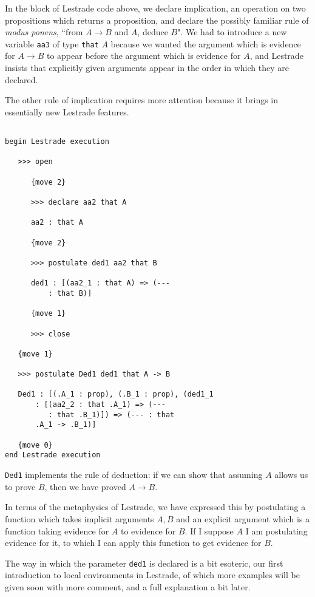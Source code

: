 \documentclass[12pt]{article}
\begin{document}
In the block of Lestrade code above, we declare implication, an operation on two propositions which returns a proposition, and
declare the possibly familiar rule of {\em modus ponens\/}, ``from $A \rightarrow B$ and $A$, deduce $B$".  We had to introduce a new variable {\tt aa3} of type {\tt that} $A$ because we wanted the argument which is evidence for $A \rightarrow B$ to appear before the argument which is evidence for $A$, and Lestrade insists that explicitly given arguments appear in the order in which they are declared.

The other rule of implication requires more attention because it brings in essentially new Lestrade features.

\begin{verbatim}

begin Lestrade execution

   >>> open

      {move 2}

      >>> declare aa2 that A

      aa2 : that A

      {move 2}

      >>> postulate ded1 aa2 that B

      ded1 : [(aa2_1 : that A) => (--- 
          : that B)]

      {move 1}

      >>> close

   {move 1}

   >>> postulate Ded1 ded1 that A -> B

   Ded1 : [(.A_1 : prop), (.B_1 : prop), (ded1_1 
       : [(aa2_2 : that .A_1) => (--- 
          : that .B_1)]) => (--- : that 
       .A_1 -> .B_1)]

   {move 0}
end Lestrade execution

\end{verbatim}

{\tt Ded1} implements the rule of deduction:  if we can show that assuming $A$ allows us to prove $B$, then we have proved $A \rightarrow B$.

In terms of the metaphysics of Lestrade, we have expressed this by postulating a function which takes implicit arguments $A,B$ and an explicit argument which is a function taking evidence for $A$ to evidence for $B$.  If I suppose $A$ I am postulating evidence for it, to which I can apply this function to get evidence for $B$.

The way in which the parameter {\tt ded1} is declared is a bit esoteric, our first introduction to local environments in Lestrade,  of which more examples will be given soon with more comment, and a full explanation a bit later.  
\end{document}
